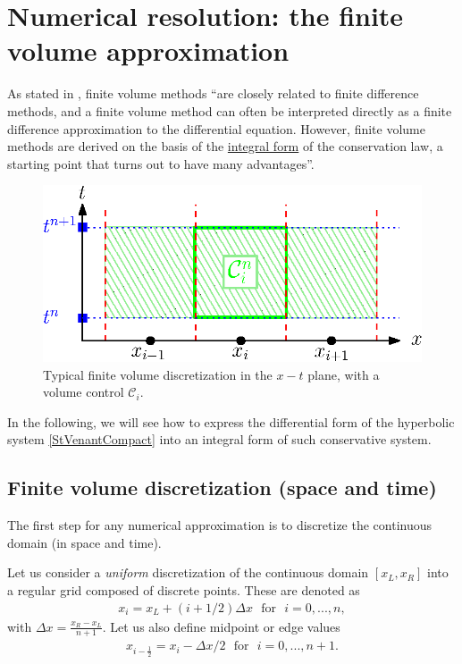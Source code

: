 \documentclass[a4paper]{article}
\numberwithin{equation}{section}
\begin{document}
	\newpage	
	\section{Numerical resolution: the finite volume approximation}
	As stated in \cite[pp. 64]{leveque_2002}, finite volume methods \enquote{are closely related to finite difference methods, and a finite volume method can often be interpreted directly as a finite difference approximation to the differential equation. However, finite volume methods are derived on the basis of the \underline{integral form} of the conservation law, a starting point that turns out to have many advantages}.
		\begin{figure}[htbp]
		\centering
		\includegraphics[scale=0.75]{imgs/fvdisc_spacetime.eps}
		\caption{Typical finite volume discretization in the $x-t$ plane, with a volume control $\mathcal{C}_i$.}
		\label{fv_spacetime}
	\end{figure}

	In the following, we will see how to express the differential form of the hyperbolic system \ref{StVenantCompact} into an integral form of such conservative system.
	\subsection{Finite volume discretization (space and time)}
	The first step for any numerical approximation is to discretize the continuous domain (in space and time). 
	
	Let us consider a \textit{uniform} discretization of the continuous domain $[x_L,x_R]$ into a regular grid composed of discrete points. These are denoted as
	\begin{align}
		x_i=x_L+(i+1/2)\Delta x \,\,\,\, \mathrm{for}\,\,\,\, i=0,...,n,
	\end{align}
	with $\Delta x = \frac{x_R-x_L}{n+1}$. Let us also define midpoint or edge values
	 \begin{align}
	  	x_{i-\frac{1}{2}}=x_i-\Delta x /2 \,\,\,\, \mathrm{for}\,\,\,\, i=0,...,n+1.
	 \end{align}
	
\end{document}
